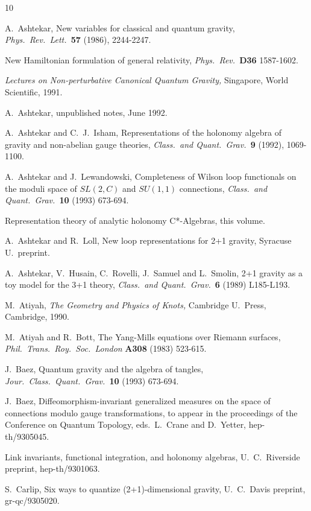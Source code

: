 \begin{thebibliography} {10}

 A.\ Ashtekar, New variables for classical and quantum gravity,
{\sl Phys.\ Rev.\ Lett.\ }{\bf 57} (1986), 2244-2247.

New Hamiltonian formulation of general
relativity, {\sl Phys.\ Rev.\ }{\bf D36} 1587-1602.

{\sl Lectures on Non-perturbative Canonical Quantum
Gravity,} Singapore, World Scientific, 1991.

  A.\ Ashtekar, unpublished notes, June 1992.

A.\ Ashtekar and C.\ J.\ Isham, Representations of the holonomy
algebra of gravity and non-abelian gauge theories, {\sl Class.\ and
Quant.\ Grav.\ }{\bf 9} (1992), 1069-1100.

A.\  Ashtekar and J.\ Lewandowski, Completeness of Wilson loop
functionals on the moduli space of $SL(2,C)$ and $SU(1,1)$
connections, {\sl Class.\ and Quant.\ Grav.\ }{\bf 10} (1993) 673-694.

Representation theory of analytic holonomy C*-Algebras,
this volume.

 A.\ Ashtekar and R.\ Loll, New loop representations
for 2+1 gravity, Syracuse U.\ preprint.

 A.\ Ashtekar, V.\ Husain, C.\ Rovelli, J.\ Samuel and
L.\ Smolin, 2+1 gravity as a toy model for the 3+1 theory, {\sl Class.\
and Quant.\ Grav.\ }{\bf 6} (1989) L185-L193.

 M.\ Atiyah, {\sl The Geometry and Physics of Knots,}
Cambridge U.\ Press, Cambridge, 1990.

 M.\ Atiyah and R.\ Bott, The Yang-Mills equations over
Riemann surfaces, {\sl Phil.\ Trans.\ Roy.\ Soc.\ London} {\bf A308}
(1983) 523-615.

 J.\ Baez, Quantum gravity and the algebra of
tangles, {\sl Jour.\ Class.\ Quant.\ Grav.\ }{\bf 10} (1993) 673-694.

  J.\ Baez, Diffeomorphism-invariant generalized measures
on the space of connections modulo gauge transformations,
to appear in the proceedings of the Conference on Quantum
Topology, eds.\ L.\ Crane and D.\ Yetter, hep-th/9305045.

Link invariants, functional integration, and holonomy algebras,
U.\ C.\ Riverside preprint, hep-th/9301063.

 S.\ Carlip, Six ways to quantize (2+1)-dimensional
gravity, U.\ C.\ Davis preprint, gr-qc/9305020.


\end{thebibliography}
